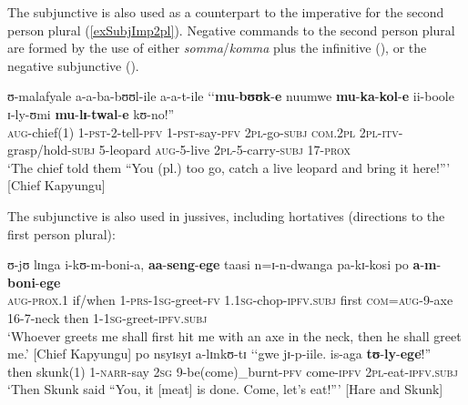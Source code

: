 The subjunctive is also used as a counterpart to the imperative for the second person plural (\ref{exSubjImp2pl}). Negative commands to the second person plural are formed by the use of either \textit{somma}/\textit{komma} plus the infinitive (), or the negative subjunctive ().
\begin{exe}
\ex \label{exSubjImp2pl}\gll ʊ-malafyale a-a-ba-bʊʊl-ile a-a-t-ile \textup{\lq\lq}\textbf{mu}-\textbf{bʊʊk}-\textbf{e} nuumwe \textbf{mu}-\textbf{ka}-\textbf{kol}-\textbf{e} ii-boole ɪ-ly-ʊmi \textbf{mu}-\textbf{lɪ}-\textbf{twal}-\textbf{e} kʊ-no!\textup{''}\\
\textsc{aug}-chief(1) 1-\textsc{pst}-2-tell-\textsc{pfv} 1-\textsc{pst}-say-\textsc{pfv} \phantom{\lq\lq}\textsc{2pl}-go-\textsc{subj} \textsc{com.2pl} \textsc{2pl}-\textsc{itv}-grasp/hold-\textsc{subj} 5-leopard \textsc{aug}-5-live \textsc{2pl}-5-carry-\textsc{subj} 17-\textsc{prox}\\
\sn `The chief told them ``You (pl.) too go, catch a live leopard and bring it here!''{}' [Chief Kapyungu]
\end{exe}

The subjunctive is also used in jussives, including hortatives (directions to the first person plural):
\begin{exe}
\ex \gll ʊ-jʊ lɪnga i-kʊ-m-boni-a, \textbf{aa}-\textbf{seng}-\textbf{ege} taasi n=ɪ-n-dwanga pa-kɪ-kosi po \textbf{a}-\textbf{m}-\textbf{boni}-\textbf{ege}\\
\textsc{aug}-\textsc{prox.1} if/when 1-\textsc{prs}-\textsc{1sg}-greet-\textsc{fv} 1.\textsc{1sg}-chop-\textsc{ipfv.subj} first \textsc{com}=\textsc{aug}-9-axe 16-7-neck then 1-\textsc{1sg}-greet-\textsc{ipfv.subj}\\
\glt `Whoever greets me shall first hit me with an axe in the neck, then he shall greet me.' [Chief Kapyungu]
\ex \gll po nsyɪsyɪ a-lɪnkʊ-tɪ \textup{\lq\lq}gwe jɪ-p-iile. is-aga \textbf{tʊ}-\textbf{ly}-\textbf{ege}!\textup{̈''}\\
then skunk(1) 1-\textsc{narr}-say \phantom{\lq\lq}\textsc{2sg} 9-be(come)\_burnt-\textsc{pfv} come-\textsc{ipfv} \textsc{2pl}-eat-\textsc{ipfv.subj}\\
\glt `Then Skunk said ``You, it [meat] is done. Come, let's eat!''{}' [Hare and Skunk]
\end{exe}

